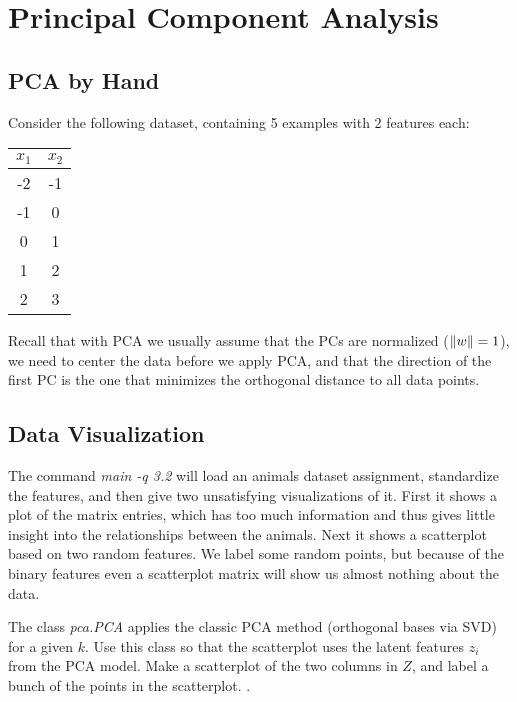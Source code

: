\documentclass{article}
\begin{document}
\section{Principal Component Analysis}

\subsection{PCA by Hand}


Consider the following dataset, containing 5 examples with 2 features each:
\begin{center}
\begin{tabular}{cc}
$x_1$ & $x_2$\\
\hline
-2 & -1\\
-1 & 0\\
0 & 1\\
1 & 2\\
2 & 3\\
\end{tabular}
\end{center}
Recall that with PCA we usually assume that the PCs are normalized ($\|w\| = 1$), we need to center the data before we apply PCA, and that the direction of the first PC is the one that minimizes the orthogonal distance to all data points.


\subsection{Data Visualization}

The command \emph{main -q 3.2} will load an animals dataset assignment, standardize the features, and then give two unsatisfying visualizations of it. 
First it shows a plot of the matrix entries, which has too much information and thus gives little insight into the relationships between the animals. 
Next it shows a scatterplot based on two random features. 
We label some random points, but because of the binary features even a scatterplot matrix will show us almost nothing about the data.

The class \emph{pca.PCA} applies the classic PCA method (orthogonal bases via SVD) for a given $k$. 
Use this class so that the scatterplot uses the latent features $z_i$ from the PCA model. 
Make a scatterplot of the two columns in $Z$, and label a bunch of the points in the scatterplot. .
 
\end{document}
